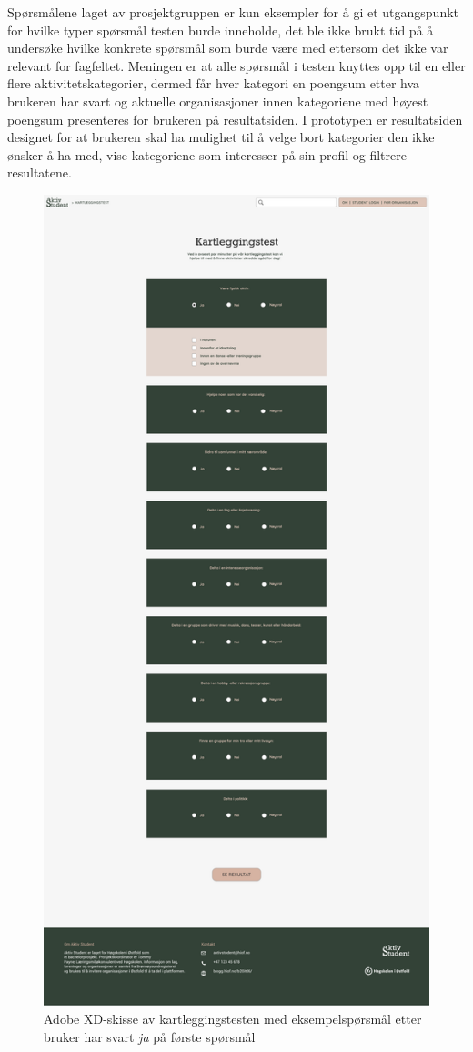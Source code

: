 Spørsmålene laget av prosjektgruppen er kun eksempler for å gi et utgangspunkt for hvilke typer spørsmål testen burde inneholde, det ble ikke brukt tid på å undersøke hvilke konkrete spørsmål som burde være med ettersom det ikke var relevant for fagfeltet. Meningen er at alle spørsmål i testen knyttes opp til en eller flere aktivitetskategorier, dermed får hver kategori en poengsum etter hva brukeren har svart og aktuelle organisasjoner innen kategoriene med høyest poengsum presenteres for brukeren på resultatsiden. I prototypen er resultatsiden designet for at brukeren skal ha mulighet til å velge bort kategorier den ikke ønsker å ha med, vise kategoriene som interesser på sin profil og filtrere resultatene.

\begin{figure}[H]
\centering
\includegraphics[width=.6\textwidth]{Illustrasjoner/Skisser-pdf/3.0/3-13-kartleggingstest-ved-svart-ja.pdf}
\caption{Adobe XD-skisse av kartleggingstesten med eksempelspørsmål etter bruker har svart {\em ja} på første spørsmål}
\label{fig:3-13-kartlegging-svart-ja}
\end{figure}

